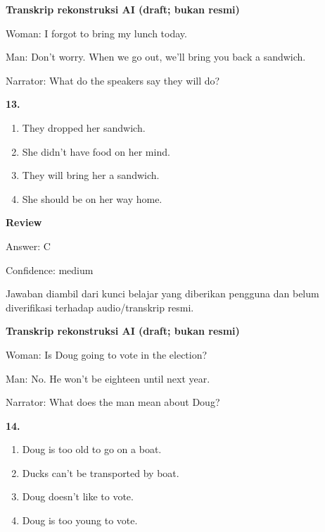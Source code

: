 \documentclass[12pt]{article}
\begin{document}
\begin{exampleblock}
\textbf{Transkrip rekonstruksi AI (draft; bukan resmi)}\par
Woman: I forgot to bring my lunch today.\par
Man: Don't worry. When we go out, we'll bring you back a sandwich.\par
Narrator: What do the speakers say they will do?\par
\end{exampleblock}
\noindent\textbf{13.}
\begin{enumerate}[label=(\Alph*),leftmargin=*,itemsep=0.2em]
\item They dropped her sandwich.
\item She didn't have food on her mind.
\item They will bring her a sandwich.
\item She should be on her way home.
\end{enumerate}
\par
\begingroup
\setlength{\parskip}{0pt}
\setlength{\parindent}{0pt}
\textbf{Review}\par
Answer: C\par
Confidence: medium\par
Jawaban diambil dari kunci belajar yang diberikan pengguna dan belum diverifikasi terhadap audio/transkrip resmi.\par
\endgroup
\par
\vspace{0.25\baselineskip}
\begin{exampleblock}
\textbf{Transkrip rekonstruksi AI (draft; bukan resmi)}\par
Woman: Is Doug going to vote in the election?\par
Man: No. He won't be eighteen until next year.\par
Narrator: What does the man mean about Doug?\par
\end{exampleblock}
\noindent\textbf{14.}
\begin{enumerate}[label=(\Alph*),leftmargin=*,itemsep=0.2em]
\item Doug is too old to go on a boat.
\item Ducks can't be transported by boat.
\item Doug doesn't like to vote.
\item Doug is too young to vote.
\end{enumerate}
\par
\begingroup
\setlength{\parskip}{0pt}
\end{document}
